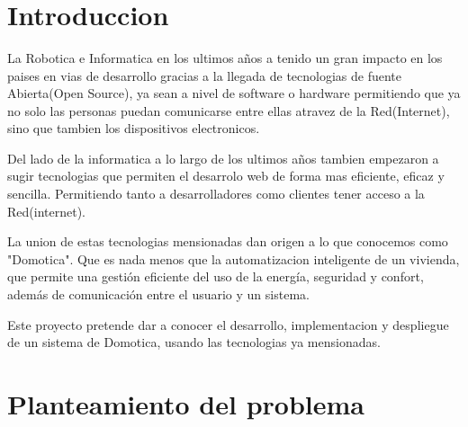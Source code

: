 \documentclass[letterpaper,12pt]{article}
\begin{document}
{\begin{center}
\begin{minipage}[b]{5.4cm}
	\end{minipage}\\
	[4cm]

	{\fontsize{12}{3}\selectfont{Cochabamba, 2018}}\\[1cm]
\end{center}



\vspace{1cm}
\ %



\tableofcontents
\newpage



\section{Introduccion}
\vspace{1cm}

La Robotica e Informatica en los ultimos años a tenido un gran impacto en los paises en vias de desarrollo gracias a la llegada de tecnologias de fuente Abierta(Open Source), ya sean a nivel de software o hardware  permitiendo que ya no solo las personas  puedan comunicarse entre ellas atravez de la Red(Internet), sino que tambien los dispositivos electronicos.

Del lado de la informatica a lo largo de los ultimos años tambien  empezaron a sugir tecnologias que permiten el desarrolo web de forma mas eficiente, eficaz y sencilla. Permitiendo tanto a desarrolladores como clientes tener acceso  a la Red(internet).


La union de estas tecnologias mensionadas dan origen a lo que conocemos como "Domotica". Que es nada menos que la automatizacion inteligente de un vivienda, que permite una gestión eficiente del uso de la energía, seguridad y confort, además de comunicación entre el usuario y un sistema. 

Este proyecto pretende dar a conocer el desarrollo, implementacion  y despliegue de un sistema de Domotica, usando las tecnologias ya mensionadas.


\section{Planteamiento del problema}
}
\end{document}

